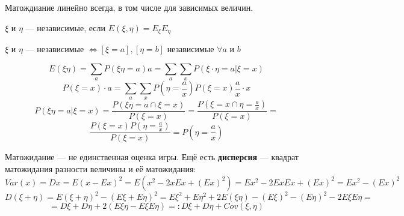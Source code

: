Матождиание линейно всегда, в том числе для зависимых величин.

\begin{theorem}
    $\xi$ и $\eta$ --- независимые, если $E(\xi, \eta) = E_\xi E_\eta$
\end{theorem}
\begin{lemma}
    $\xi$ и $\eta$ --- независимые $\Leftrightarrow [\xi=a], [\eta=b]$ независимые $\forall a$ и $b$
\end{lemma}
$$E(\xi\eta)=\sum\limits_{a}P(\xi\eta=a)a=\sum\limits_{a}\sum\limits_{x} P(\xi\cdot\eta=a | \xi=x)$$
$$P(\xi=x)\cdot a=\sum\limits_{a}\sum\limits_{x} P\left(\eta=\frac{a}{x}\right)P(\xi=x)\frac{a}{x}\cdot x$$
$$P(\xi\eta=a | \xi=x)=\frac{P(\xi\eta=a\cap\xi=x)}{P(\xi=x)}=\frac{P(\xi=x\cap \eta=\frac{a}{x})}{P(\xi=x)}=$$
$$\frac{P(\xi=x)P(\eta=\frac{a}{x})}{P(\xi=x)}=P(\eta=\frac{a}{x})$$

Матожидание --- не единственная оценка игры. Ещё есть \textbf{дисперсия} --- квадрат матожидания разности величины и её матожидания:
$$Var(x)=Dx=E(x-Ex)^2=E(x^2-2xEx+(Ex)^2)=Ex^2-2ExEx+(Ex)^2=Ex^2-(Ex)^2$$
$$D(\xi+\eta)=E(\xi+\eta)^2-(E\xi+E\eta)^2=E\xi^2+E\eta^2+2E(\xi\eta)-(E\xi)^2-(E\eta)^2-2E\xi E\eta=$$
$$=D\xi+D\eta+2(E\xi\eta - E\xi E\eta)=:D\xi+D\eta+Cov(\xi, \eta)$$

